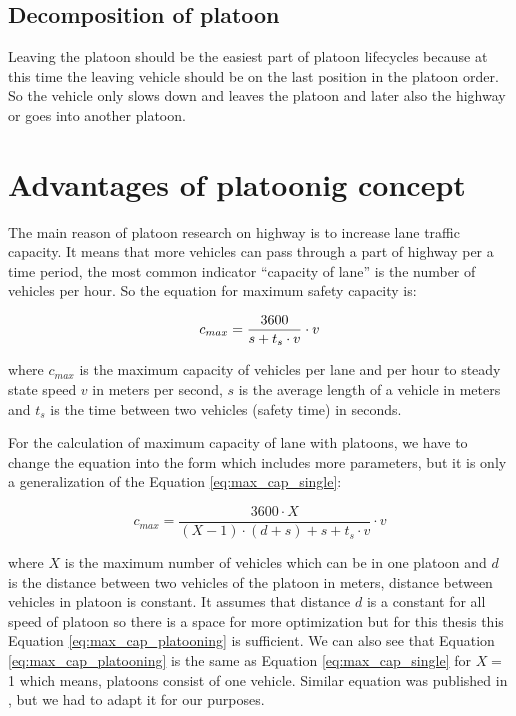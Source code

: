 \subsection{Decomposition of platoon}

Leaving the platoon should be the easiest part of platoon lifecycles because at this time the leaving vehicle should be on the last position in the platoon order. So the vehicle only slows down and leaves the platoon and later also the highway or goes into another platoon.

\section{Advantages of platoonig concept}

The main reason of platoon research on highway is to increase lane traffic capacity. It means that more vehicles can pass through a part of highway per a time period, the most common indicator “capacity of lane” is the number of vehicles per hour. So the equation for maximum safety capacity is: 

\begin{equation}\protect\label{eq:max_cap_single}
c_{max}=\frac{3600}{s+t_{s}\cdot v}\cdot v
\end{equation}

where  $c_{max}$  is the maximum capacity of vehicles per lane and per hour to steady state speed $v$ in meters per second, $s$ is the average length of a vehicle in meters and  $t_{s}$ is the time between two vehicles (safety time) in seconds.

For the calculation of maximum capacity of lane with platoons, we have to change the equation into the form which includes more parameters, but it is only a generalization of the Equation \ref{eq:max_cap_single}:

\begin{equation}\label{eq:max_cap_platooning}
c_{max}=\frac{3600\cdot X}{(X-1)\cdot(d+s)+s+t_{s}\cdot v}\cdot v
\end{equation}

where $X$ is the maximum number of vehicles which can be in one platoon and $d$ is the distance between two vehicles of the platoon in meters, distance between vehicles in platoon is constant. It assumes that distance $d$ is a constant for all speed of platoon so there is a space for more optimization but for this thesis this Equation \ref{eq:max_cap_platooning} is sufficient. We can also see that Equation \ref{eq:max_cap_platooning} is the same as Equation \ref{eq:max_cap_single} for  $X=$ 1  which means, platoons consist of one vehicle. Similar equation was published in \cite{dao2013strategy}, but we had to adapt it for our purposes. 

